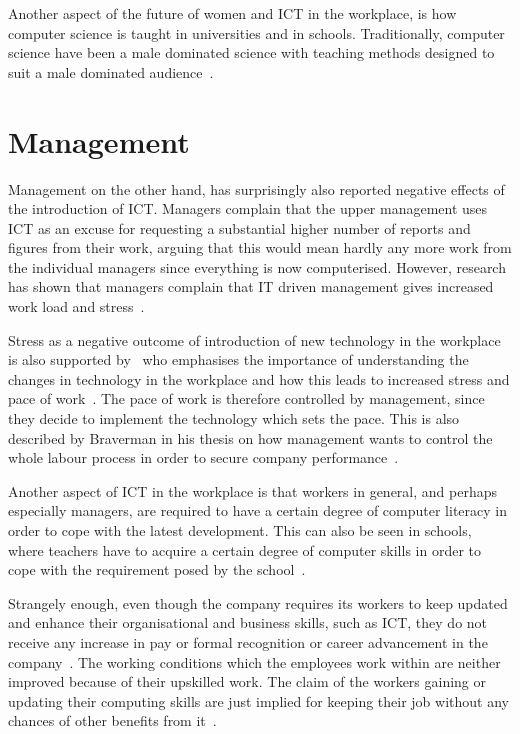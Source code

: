 \documentclass[a4paper,12pt,titlepage]{article}
\begin{document}
  Another aspect of the future of women and ICT in the workplace, is how
  computer science is taught in universities and in schools.
  Traditionally, computer science have been a male dominated
  science with teaching methods designed to suit a male
  dominated audience~\cite[155]{jw}.
  
  \section{Management}
  Management on the other hand, has surprisingly also reported
  negative effects of the introduction of ICT. Managers complain that
  the upper management uses ICT as an excuse for requesting a substantial
  higher number of reports and figures from their work, arguing
  that this would mean hardly any more work from the individual
  managers since everything is now computerised. However,
  research has shown that managers complain that IT driven
  management gives increased work load and stress~\cite[173]{bbt}.

  Stress as a negative outcome of introduction of new technology
  in the workplace is also supported by~ who emphasises
  the importance of understanding the changes in technology in the workplace
  and how this leads to increased stress and pace of work~\cite[127]{jg}.
  The pace of work is therefore controlled by management, since they
  decide to implement the technology which sets the pace. This is also 
  described by Braverman in his thesis on how
  management wants to control the whole labour process in order
  to secure company performance~\cite[195]{hb}. 

  Another aspect of ICT in the workplace is that workers
  in general, and perhaps especially managers, are required
  to have a certain degree of computer literacy in order
  to cope with the latest development. This can also be seen
  in schools, where teachers have to acquire a certain degree
  of computer skills in order to cope with the requirement posed by
  the school~\cite[242]{sc}.

  Strangely enough, even though the company requires its workers
  to keep updated and enhance their organisational and business
  skills, such as ICT, they do not receive any increase in pay
  or formal recognition or career advancement in the
  company~\cite[144]{brp}. The working conditions which the employees
  work within are neither improved because of their upskilled
  work. The claim of the workers gaining or updating their computing
  skills are just implied for keeping their job without any chances
  of other benefits from it~\cite[128]{jg}.
\end{document}
